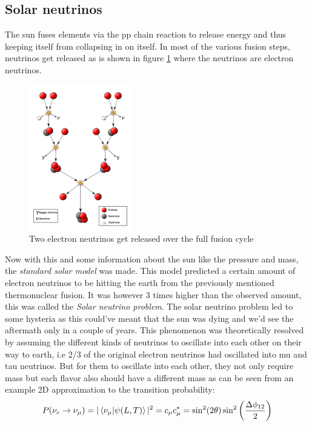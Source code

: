 \subsection{Solar neutrinos}
The sun fuses elements via the pp chain reaction to release energy and thus
keeping itself from collapsing in on itself. In most of the various fusion
steps, neutrinos get released as is shown in figure
\ref{fig:SunFusion} where the neutrinos are electron
neutrinos.
\begin{figure}
	\centering
	\includegraphics[width=0.4\textwidth]{figures/SunFusion.png}
	\caption{Two electron neutrinos get released over the full fusion cycle}
	\label{fig:SunFusion}
\end{figure}
Now with this and some information about the sun like the pressure and mass,
the \textit{standard solar model} was made. This model predicted a certain
amount of electron neutrinos to be hitting the earth from the previously mentioned
thermonuclear fusion. It was however 3 times higher than the observed amount\cite{Cleveland_1998}, 
this was called the \textit{Solar neutrino problem}. 
The solar neutrino problem led to some hysteria as this could've meant
that the sun was dying and we'd see the aftermath only in a couple of years.
This phenomenon was theoretically resolved by assuming\cite{Bilenky2013} the 
different kinds of neutrinos to oscillate into each other on their way to
earth, i.e 2/3 of the original electron neutrinos had oscillated into mu and
tau neutrinos. But for them to oscillate into each other, they not
only require mass but each flavor also should have a different mass as can be seen
from an example 2D approximation to the transition probability\cite{Bellini_2014}:
\begin{equation}
	P(\nu_e\rightarrow\nu_\mu) = |\braket{\nu_\mu|\psi(L,T)}|^2 = c_\mu c_\mu^* = \sin ^2(2 \theta) \sin ^2\left(\frac{\Delta \phi_{12}}{2}\right)
\end{equation}
